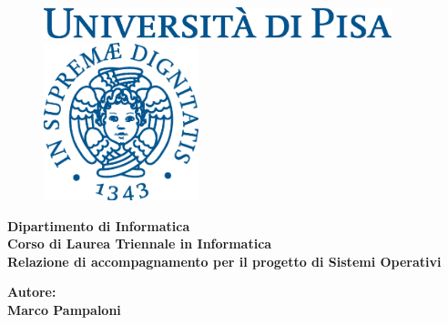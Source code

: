 \documentclass[11pt]{article}
\begin{document}
\begin{titlepage}
  \begin{figure}[t]
    \centering\includegraphics[width=0.9\textwidth]{./img/logo.eps}
    
    \vspace{1cm}
    
    \centering\includegraphics[width=0.4\textwidth]{./img/cherubino.eps}
  \end{figure}

  \begin{center}
    \textbf{ Dipartimento di Informatica\\ Corso di Laurea Triennale in Informatica\\}
    \vspace{15mm}
    {\LARGE{\bf Relazione di accompagnamento per il progetto di Sistemi
        Operativi}}\\
  \end{center}

  \vspace{50mm}

  \begin{minipage}[t]{0.47\textwidth}
    {
    }
  \end{minipage}\hfill
  \begin{minipage}[t]{0.47\textwidth}\raggedleft
    {\LARGE{\bf Autore: \\ Marco Pampaloni}}
  \end{minipage}

  \vfill


\end{titlepage}
\end{document}
